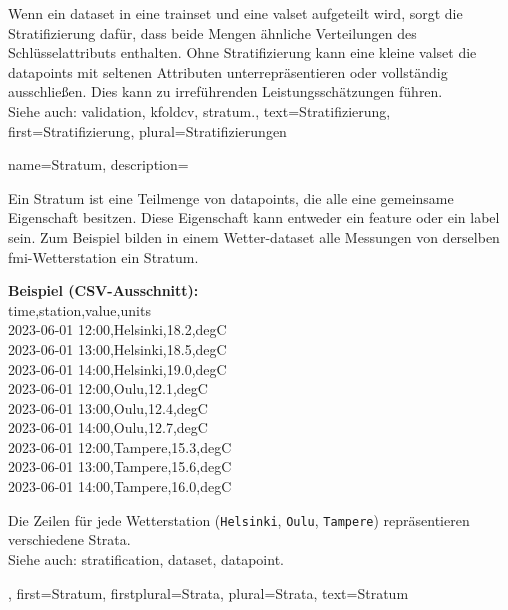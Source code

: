 {{  Wenn ein \gls{dataset} in eine \gls{trainset} und eine \gls{valset} aufgeteilt wird, sorgt die Stratifizierung dafür, dass beide Mengen
ähnliche Verteilungen des Schlüsselattributs enthalten. Ohne Stratifizierung kann eine kleine \gls{valset} die \glspl{datapoint} mit seltenen
 Attributen unterrepräsentieren oder vollständig ausschließen. Dies kann zu irreführenden Leistungsschätzungen führen.\\
  
  Siehe auch: \gls{validation}, \gls{kfoldcv}, \gls{stratum}.},
  text={Stratifizierung},
  first={Stratifizierung},
  plural={Stratifizierungen}
}

{
  name={Stratum},
  description={
Ein  Stratum ist eine Teilmenge von \glspl{datapoint}, die alle eine gemeinsame Eigenschaft besitzen. Diese Eigenschaft kann entweder ein \gls{feature} oder ein \gls{label} sein. Zum Beispiel bilden in einem Wetter-\gls{dataset} alle Messungen von derselben \gls{fmi}-Wetterstation ein Stratum.\\[0.5em]
\begin{center}
\textbf{Beispiel (CSV-Ausschnitt):}\\
{\ttfamily
time,station,value,units\\
2023-06-01 12:00,Helsinki,18.2,degC\\
2023-06-01 13:00,Helsinki,18.5,degC\\
2023-06-01 14:00,Helsinki,19.0,degC\\
2023-06-01 12:00,Oulu,12.1,degC\\
2023-06-01 13:00,Oulu,12.4,degC\\
2023-06-01 14:00,Oulu,12.7,degC\\
2023-06-01 12:00,Tampere,15.3,degC\\
2023-06-01 13:00,Tampere,15.6,degC\\
2023-06-01 14:00,Tampere,16.0,degC
}
\end{center} 
Die Zeilen für jede Wetterstation (\texttt{Helsinki}, \texttt{Oulu}, \texttt{Tampere}) repräsentieren verschiedene Strata.\\
Siehe auch: \gls{stratification}, \gls{dataset}, \gls{datapoint}.},
  first={Stratum},
  firstplural={Strata},
  plural={Strata},
  text={Stratum}
}



